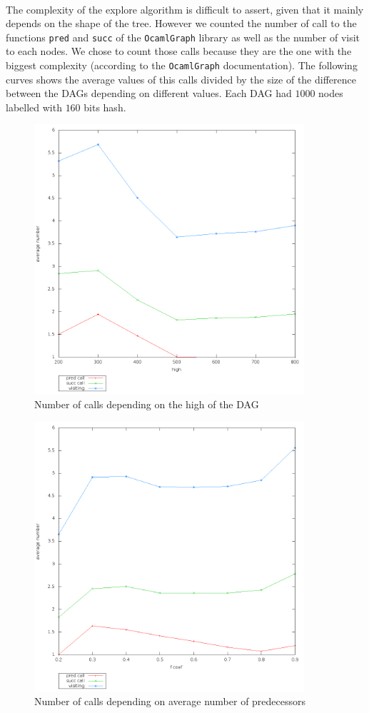  \paragraph{} The complexity of the explore algorithm is difficult to assert, given that it mainly depends on the shape of the tree. However we counted the number of call to the functions \texttt{pred} and \texttt{succ} of the \texttt{OcamlGraph} library as well as the number of visit to each nodes. We chose to count those calls because they are the one with the biggest complexity (according to the \texttt{OcamlGraph} documentation). The following curves shows the average values of this calls divided by the size of the difference between the DAGs depending on different values. Each DAG had $1000$ nodes labelled with $160$ bits hash.
\begin{figure}[H]
 \centering
  \includegraphics[height=10cm]{./image/eval/call_depending_on_high_over_size.png}
  \caption{Number of calls depending on the high of the DAG}
 \end{figure}
 \begin{figure}[H]
 \centering
  \includegraphics[height=10cm]{./image/eval/call_depending_on_f_coef.png}
  \caption{Number of calls depending on average number of predecessors}
 \end{figure}
